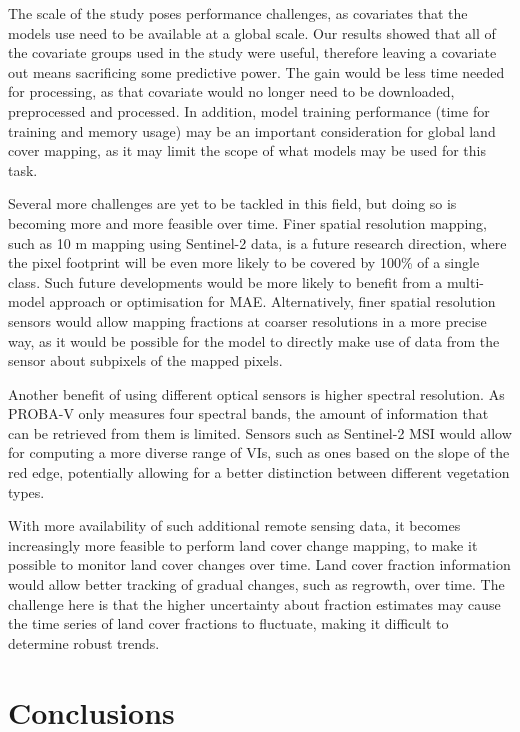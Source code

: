 \documentclass[review,authoryear,3p]{elsarticle}
\begin{document}
The scale of the study poses performance challenges, as covariates that the models use need to be available at a global scale.
Our results showed that all of the covariate groups used in the study were useful, therefore leaving a covariate out means sacrificing some predictive power.
The gain would be less time needed for processing, as that covariate would no longer need to be downloaded, preprocessed and processed.
In addition, model training performance (time for training and memory usage) may be an important consideration for global land cover mapping, as it may limit the scope of what models may be used for this task.

Several more challenges are yet to be tackled in this field, but doing so is becoming more and more feasible over time.
Finer spatial resolution mapping, such as 10 m mapping using Sentinel-2 data, is a future research direction, where the pixel footprint will be even more likely to be covered by 100\% of a single class.
Such future developments would be more likely to benefit from a multi-model approach or optimisation for \gls{MAE}.
Alternatively, finer spatial resolution sensors would allow mapping fractions at coarser resolutions in a more precise way, as it would be possible for the model to directly make use of data from the sensor about subpixels of the mapped pixels.

Another benefit of using different optical sensors is higher spectral resolution.
As PROBA-V only measures four spectral bands, the amount of information that can be retrieved from them is limited.
Sensors such as Sentinel-2 \gls{MSI} would allow for computing a more diverse range of \glspl{VI}, such as ones based on the slope of the red edge, potentially allowing for a better distinction between different vegetation types.

With more availability of such additional remote sensing data, it becomes increasingly more feasible to perform land cover change mapping, to make it possible to monitor land cover changes over time.
Land cover fraction information would allow better tracking of gradual changes, such as regrowth, over time.
The challenge here is that the higher uncertainty about fraction estimates may cause the time series of land cover fractions to fluctuate, making it difficult to determine robust trends.

\section{Conclusions}
\end{document}
